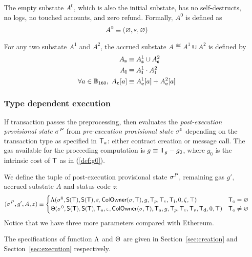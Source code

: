 The empty substate $A^0$, which is also the initial substate, has no self-destructs, no logs, no touched accounts, and zero refund. Formally, $A^0$ is defined as
\begin{align}
	A^0\equiv \left( \varnothing, \mathbb{\varepsilon}, \varnothing\right)
\end{align}

For any two substate $A^1$ and $A^2$, the accrued substate $A\eqdef A^1\Cup A^2$ is defined by 
\begin{align}
	A_{\bf s} &\equiv A^1_{\bf s} \cup A^2_{\bf s} \\ 
	A_{\bf l} &\equiv A^1_{\bf l} \cdot A^2_{\bf l} \\
	\forall a\in\mathbb{B}_{160},\; A_{\bf c}[a] & \equiv A^1_{\bf c}[a]+A^2_{\bf c}[a]
\end{align}


\subsubsection{Type dependent execution}

If transaction passes the preprocessing, 
then {\name} evaluates the \emph{post-execution provisional state} $\mathbf{\sigma}^P$ from \emph{pre-execution provisional state} $\mathbf{\sigma}^0$ depending on the transaction type as specified in $\textsf{T}_a$: either contract creation or message call. 
%
The gas available for the proceeding computation is $g\equiv \textsf{T}_g-g_0$, where $g_0$ is the intrinsic cost of $\textsf{T}$ as in (\ref{def:g0}). 

We define the tuple of post-execution provisional state $\mathbf{\sigma}^{P}$, remaining gas $g'$, accrued substate $A$ and status code $z$:
\begin{align}\label{def:transform}
	(\mathbf{\sigma}^{P},g',A,z)\equiv
	\begin{cases}
		\mathrm{\Lambda}(\mathbf{\sigma}^0,\mathsf{S}{\left({\textsf{T}} \right)},\mathsf{S}{\left({\textsf{T}} \right)},\mathbb{\varepsilon}, \mathsf{ColOwner}(\mathbf{\sigma},\textsf{T}),g,\textsf{T}_p,\textsf{T}_v,\textsf{T}_{\bf i},0,\zeta,\top) &  \textsf{T}_a=\varnothing \\
		\mathrm{\Theta}(\mathbf{\sigma}^0,\mathsf{S}{\left({\textsf{T}} \right)},\mathsf{S}{\left({\textsf{T}} \right)},\textsf{T}_a,\mathbb{\varepsilon},\mathsf{ColOwner}(\mathbf{\sigma},\textsf{T}),\textsf{T}_a,g,\textsf{T}_p,\textsf{T}_v,\textsf{T}_v,\textsf{T}_{\bf d},0,\top) & \textsf{T}_a\neq\varnothing
	\end{cases}
\end{align}
%
Notice that we have three more parameters compared with Ethereum. 

The specifications of function $\mathrm{\Lambda}$ and $\mathrm{\Theta}$ are given in Section~\ref{sec:creation} and Section~\ref{sec:execution} respectively.

